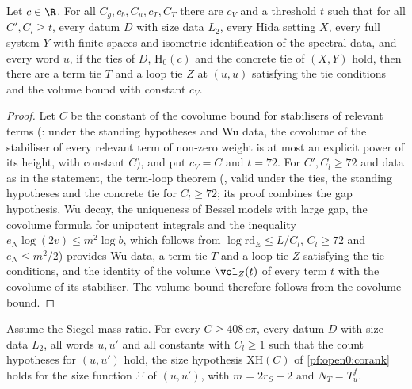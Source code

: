 \begin{proposition}\label{pf:open0:tieon}
Let $c\in\R$. For all $C_g,c_b,C_u,c_T,C_T$ there are $c_V$ and a threshold $t$ such that for all $C',C_l\ge t$, every datum $D$ with size data
$L_2$, every Hida setting $X$, every full system $Y$ with finite spaces and isometric identification of the spectral data, and every
word $u$, if the ties of $D$, $\mathrm{H}_0(c)$ and the concrete tie of $(X,Y)$ hold, then there are a term tie $T$ and a loop tie $Z$ at
$(u,u)$ satisfying the tie conditions and the volume bound with constant $c_V$.
\end{proposition}

\begin{proof}
Let $C$ be the constant of the covolume bound for stabilisers of relevant terms
(: under the standing hypotheses and Wu data, the covolume of the
stabiliser of every relevant term of non-zero weight is at most an explicit power of its height, with constant $C$), and put $c_V=C$ and
$t=72$. For $C',C_l\ge72$ and data as in the statement, the term-loop theorem
(, valid under the ties, the standing hypotheses and the concrete tie
for $C_l\ge72$; its proof combines the gap hypothesis, Wu decay, the uniqueness of Bessel models with large gap, the covolume formula for
unipotent integrals and the inequality $e_N\log(2v)\le m^2\log b$, which follows from $\log\mathrm{rd}_E\le L/C_l$, $C_l\ge72$ and
$e_N\le m^2/2$) provides Wu data, a term tie $T$ and a loop tie $Z$ satisfying the tie conditions, and the
identity of the volume $\vol_Z(t)$ of every term $t$ with the covolume of its stabiliser. The volume bound therefore follows from the
covolume bound.
\end{proof}

\begin{proposition}\label{pf:open0:xisizes}
Assume the Siegel mass ratio. For every $C\ge408\,e\pi$, every datum $D$ with size data $L_2$, all words $u,u'$ and all constants with
$C_l\ge1$ such that the count hypotheses for $(u,u')$ hold, the size hypothesis $\mathrm{XH}(C)$ of \cref{pf:open0:corank} holds for the size
function $\Xi$ of $(u,u')$, with $m=2r_S+2$ and $N_T=T_u^f$.
\ 
\end{proposition}

